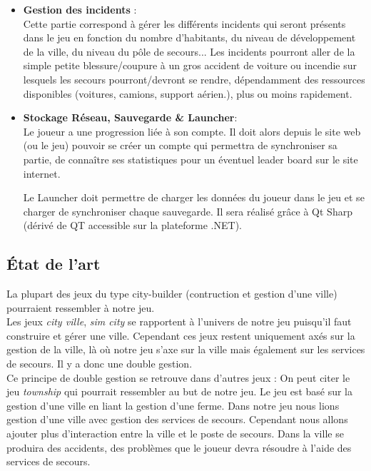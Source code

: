 \begin{itemize}
        \item \textbf{Gestion des incidents} :\\
        Cette partie correspond à gérer les différents incidents qui seront présents dans le jeu en fonction du nombre d'habitants, du niveau de développement de la ville, du niveau du pôle de secours... Les incidents pourront aller de la simple petite blessure/coupure à un gros accident de voiture ou incendie sur lesquels les secours pourront/devront se rendre, dépendamment des ressources disponibles (voitures, camions, support aérien.), plus ou moins rapidement.
        \\
    
        \item \textbf{Stockage Réseau, Sauvegarde \& Launcher}:\\
        Le joueur a une progression liée à son compte. Il doit alors depuis le site web (ou le jeu) pouvoir se créer un compte qui permettra de synchroniser sa partie, de connaître ses statistiques pour un éventuel leader board sur le site internet.
        
        Le Launcher doit permettre de charger les données du joueur dans le jeu et se charger de synchroniser chaque sauvegarde. Il sera réalisé grâce à Qt Sharp (dérivé de QT accessible sur la plateforme .NET).
         \\
    \end{itemize}

\subsection{État de l'art}

La plupart des jeux du type city-builder (contruction et gestion d'une ville) pourraient ressembler à notre jeu.\\ 

Les jeux \textit{city ville\footnotemark[1]}, \textit{sim city\footnotemark[2]} se rapportent à l'univers de notre jeu puisqu'il faut construire et gérer une ville. Cependant ces jeux restent uniquement axés sur la gestion de la ville, là où notre jeu s'axe sur la ville mais également sur les services de secours. Il y a donc une double gestion.\\

Ce principe de double gestion se retrouve dans d'autres jeux : On peut citer le jeu \textit{township\footnotemark[3]} qui pourrait ressembler au but de notre jeu. Le jeu est basé sur la gestion d'une ville en liant la gestion d'une ferme. Dans notre jeu nous lions gestion d'une ville avec gestion des services de secours. Cependant nous allons ajouter plus d'interaction entre la ville et le poste de secours. Dans la ville se produira des accidents, des problèmes que le joueur devra résoudre à l'aide des services de secours.\\

